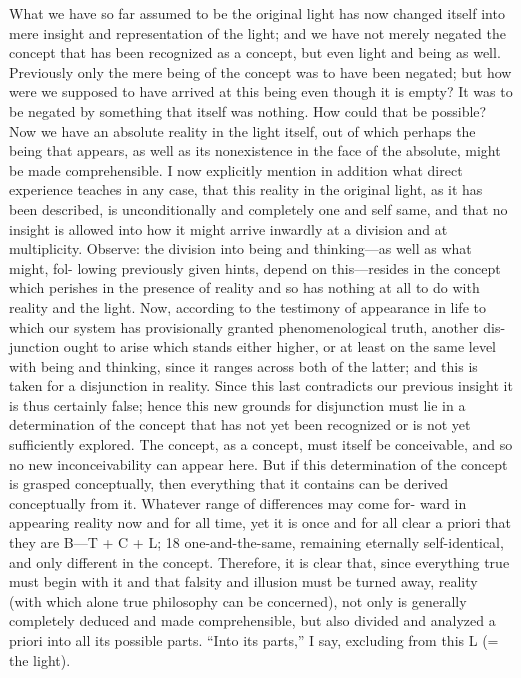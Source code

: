  What we
have so far assumed to be the original light has now changed itself into mere
insight and representation of the light; and we have not merely negated the
concept that has been recognized as a concept, but even light and being as
well.
 Previously only the mere being of the concept was to have been negated;
but how were we supposed to have arrived at this being even though it is
empty? It was to be negated by something that itself was nothing.
 How could
that be possible? Now we have an absolute reality in the light itself, out of
which perhaps the being that appears, as well as its nonexistence in the face of
the absolute, might be made comprehensible.
I now explicitly mention in addition what direct experience teaches in
any case, that this reality in the original light, as it has been described, is
unconditionally and completely one and self same, and that no insight is
allowed into how it might arrive inwardly at a division and at multiplicity.
Observe: the division into being and thinking—as well as what might, fol-
lowing previously given hints, depend on this—resides in the concept which
perishes in the presence of reality and so has nothing at all to do with reality
and the light.
 Now, according to the testimony of appearance in life to which
our system has provisionally granted phenomenological truth, another dis-
junction ought to arise which stands either higher, or at least on the same level
with being and thinking, since it ranges across both of the latter; and this is
taken for a disjunction in reality.
 Since this last contradicts our previous
insight it is thus certainly false; hence this new grounds for disjunction must
lie in a determination of the concept that has not yet been recognized or is not
yet sufficiently explored.
 The concept, as a concept, must itself be conceivable,
and so no new inconceivability can appear here.
 But if this determination of
the concept is grasped conceptually, then everything that it contains can be
derived conceptually from it.
 Whatever range of differences may come for-
ward in appearing reality now and for all time, yet it is once and for all clear
a priori that they are B—T + C + L; 18 one-and-the-same, remaining eternally
self-identical, and only different in the concept.
Therefore, it is clear that, since everything true must begin with it
and that falsity and illusion must be turned away,
reality (with which alone true philosophy can be concerned),
not only is generally completely deduced and made comprehensible,
but also divided and analyzed a priori into all its possible parts.
“Into its parts,” I say, excluding from this L (= the light).
